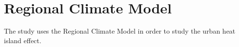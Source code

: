 \section{Regional Climate Model}
	The study uses the Regional Climate Model in order to study the urban heat island effect.
	

%
%
%	
%	
%
%	
%
%
%
%
%	
